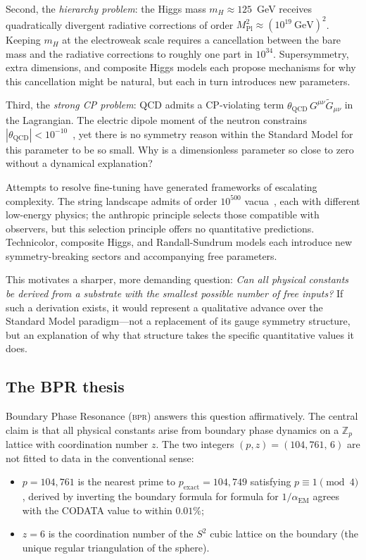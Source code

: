 \documentclass[aps,prd,twocolumn,superscriptaddress,longbibliography,nofootinbib]{revtex4-2}
\newcommand{\Zp}{\mathbb{Z}_p}
\newcommand{\Stwo}{S^2}
\newcommand{\alphaEM}{\alpha_{\mathrm{EM}}}
\newcommand{\bpr}{\textsc{bpr}}
\begin{document}
Second, the \textit{hierarchy problem}: the Higgs mass $m_H \approx
125$~GeV receives quadratically divergent radiative corrections of
order $M_{\mathrm{Pl}}^2 \approx (10^{19}~\text{GeV})^2$.  Keeping
$m_H$ at the electroweak scale requires a cancellation between the
bare mass and the radiative corrections to roughly one part in
$10^{34}$.  Supersymmetry, extra dimensions, and composite Higgs
models each propose mechanisms for why this cancellation might be
natural, but each in turn introduces new parameters.

Third, the \textit{strong CP problem}: QCD admits a CP-violating term
$\theta_{\mathrm{QCD}}\, G^{\mu\nu}\tilde{G}_{\mu\nu}$ in the
Lagrangian.  The electric dipole moment of the neutron constrains
$|\theta_{\mathrm{QCD}}| < 10^{-10}$~\cite{PDG2024}, yet there is no
symmetry reason within the Standard Model for this parameter to be so
small.  Why is a dimensionless parameter so close to zero without a
dynamical explanation?

Attempts to resolve fine-tuning have generated frameworks of
escalating complexity.  The string landscape admits of order
$10^{500}$ vacua~\cite{Bousso2000}, each with different low-energy
physics; the anthropic principle selects those compatible with
observers, but this selection principle offers no quantitative
predictions.  Technicolor, composite Higgs, and Randall-Sundrum
models each introduce new symmetry-breaking sectors and accompanying
free parameters.

This motivates a sharper, more demanding question: \textit{Can all
physical constants be derived from a substrate with the smallest
possible number of free inputs?}  If such a derivation exists, it
would represent a qualitative advance over the Standard Model
paradigm---not a replacement of its gauge symmetry structure, but an
explanation of why that structure takes the specific quantitative
values it does.

\subsection{The BPR thesis}

Boundary Phase Resonance (\bpr) answers this question affirmatively.
The central claim is that all physical constants arise from boundary
phase dynamics on a $\Zp$ lattice with coordination number $z$.
The two integers $(p, z) = (104{,}761,\, 6)$ are not fitted to
data in the conventional sense:
\begin{itemize}
\item $p = 104{,}761$ is the nearest prime to $p_\text{exact}=104{,}749$ satisfying $p\equiv 1\pmod{4}$, derived by inverting the boundary formula for
  formula for $1/\alphaEM$ agrees with the CODATA value to within
  $0.01\%$;
\item $z = 6$ is the coordination number of the $\Stwo$ cubic
  lattice on the boundary (the unique regular triangulation of the
  sphere).
\end{itemize}
\end{document}
